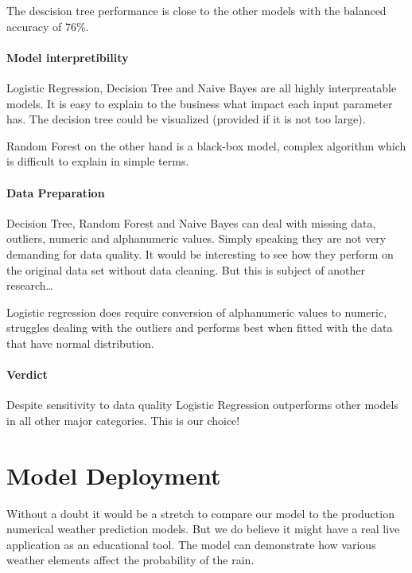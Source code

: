 The descision tree performance is close to the other models with the
balanced accuracy of 76\%.

\hypertarget{model-interpretibility}{%
\paragraph{Model interpretibility}\label{model-interpretibility}}

Logistic Regression, Decision Tree and Naive Bayes are all highly
interpreatable models. It is easy to explain to the business what impact
each input parameter has. The decision tree could be visualized
(provided if it is not too large).

Random Forest on the other hand is a black-box model, complex algorithm
which is difficult to explain in simple terms.

\hypertarget{data-preparation-1}{%
\paragraph{Data Preparation}\label{data-preparation-1}}

Decision Tree, Random Forest and Naive Bayes can deal with missing data,
outliers, numeric and alphanumeric values. Simply speaking they are not
very demanding for data quality. It would be interesting to see how they
perform on the original data set without data cleaning. But this is
subject of another research\ldots{}

Logistic regression does require conversion of alphanumeric values to
numeric, struggles dealing with the outliers and performs best when
fitted with the data that have normal distribution.

\hypertarget{verdict}{%
\paragraph{Verdict}\label{verdict}}

Despite sensitivity to data quality Logistic Regression outperforms
other models in all other major categories. This is our choice!

\hypertarget{model-deployment}{%
\section{Model Deployment}\label{model-deployment}}

Without a doubt it would be a stretch to compare our model to the
production numerical weather prediction models. But we do believe it
might have a real live application as an educational tool. The model can
demonstrate how various weather elements affect the probability of the
rain.

